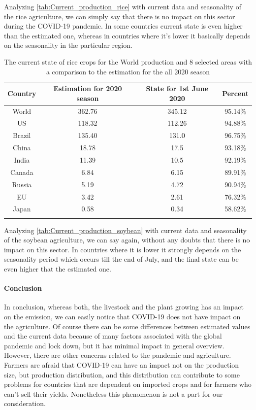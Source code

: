 Analyzing \autoref{tab:Current_production_rice} with current data and seasonality of the rice agriculture, we can simply say that there is no impact on this sector during the COVID-19 pandemic. In some countries current state is even higher than the estimated one, whereas in countries where it's lower it basically depends on the seasonality in the particular region. 
		
		
		
\begin{table}[h!]
\centering
\begin{tabular}{c c c c} 
\hline
Country & Estimation for 2020 season & State for 1st June 2020 & Percent \\ 
\hline\hline
World & 362.76 & 345.12 & 95.14\% \\
US & 118.32 & 112.26 & 94.88\% \\ 
Brazil & 135.40 & 131.0 & 96.75\% \\
China & 18.78 & 17.5 & 93.18\% \\
India & 11.39 & 10.5 & 92.19\% \\
Canada & 6.84 & 6.15 & 89.91\%  \\ 
Russia & 5.19 & 4.72 & 90.94\% \\
EU & 3.42 & 2.61 & 76.32\% \\
Japan & 0.58 & 0.34 & 58.62\% \\
\hline
&&& \\
\end{tabular}
\caption{The current state of rice crops for the World production and 8 selected areas with a comparison to the estimation for the all 2020 season}
\label{tab:Current_production_soybean}
\end{table}

Analyzing \autoref{tab:Current_production_soybean} with current data and seasonality of the soybean agriculture, we can say again, without any doubts that there is no impact on this sector. In countries where it is lower it strongly depends on the seasonality period which occurs till the end of July, and the final state can be even higher that the estimated one. 

\paragraph{Conclusion}

In conclusion, whereas both, the livestock and the plant growing has an impact on the \co emission, we can easily notice that COVID-19 does not have impact on the agriculture. Of course there can be some differences between estimated values and the current data because of many factors associated with the global pandemic and lock down, but it has minimal impact in general overview. 
However, there are other concerns related to the pandemic and agriculture. Farmers are afraid that COVID-19 can have an impact not on the production size, but production distribution, and this distribution can contribute to some problems for countries that are dependent on imported crops and for farmers who can't sell their yields. Nonetheless this phenomenon is not a part for our consideration. 
				
